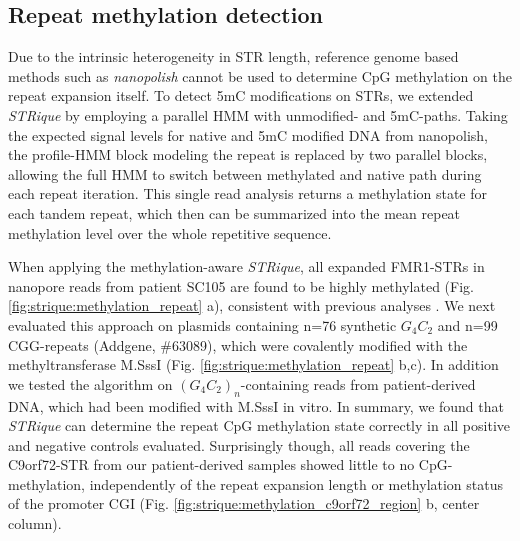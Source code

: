 \subsection{Repeat methylation detection}
\label{subsec:strique:modifications_repeat}


Due to the intrinsic heterogeneity in STR length, reference genome based methods such as \textit{nanopolish} cannot be used to determine CpG methylation on the repeat expansion itself. To detect 5mC modifications on STRs, we extended \textit{STRique} by employing a parallel HMM with unmodified- and 5mC-paths. Taking the expected signal levels for native and 5mC modified DNA from nanopolish, the profile-HMM block modeling the repeat is replaced by two parallel blocks, allowing the full HMM to switch between methylated and native path during each repeat iteration.
This single read analysis returns a methylation state for each tandem repeat, which then can be summarized into the mean repeat methylation level over the whole repetitive sequence.

When applying the methylation-aware \textit{STRique}, all expanded FMR1-STRs in nanopore reads from patient SC105 are found to be highly methylated (Fig. \ref{fig:strique:methylation_repeat} a), consistent with previous analyses \cite{Hornstra1993}. We next evaluated this approach on plasmids containing n=76 synthetic $ G_{4}C_{2} $ and n=99 CGG-repeats (Addgene, \#63089), which were covalently modified with the methyltransferase M.SssI (Fig. \ref{fig:strique:methylation_repeat} b,c). In addition we tested the algorithm on $ (G_{4}C_{2})_{n} $-containing reads from patient-derived DNA, which had been modified with M.SssI in vitro. In summary, we found that \textit{STRique} can determine the repeat CpG methylation state correctly in all positive and negative controls evaluated.
Surprisingly though, all reads covering the C9orf72-STR from our patient-derived samples showed little to no CpG-methylation, independently of the repeat expansion length or methylation status of the promoter CGI (Fig. \ref{fig:strique:methylation_c9orf72_region} b, center column).




